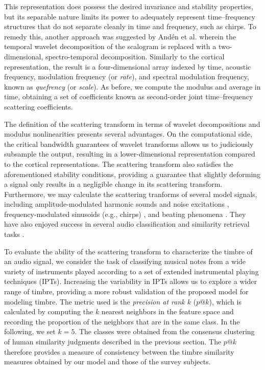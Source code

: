 \documentclass{bmcart}
\makeatletter
\newcommand{\patk}{p\mathrm{@}k}
\makeatother
\begin{document}
This representation does possess the desired invariance and stability properties, but its separable nature limits its power to adequately represent time--frequency structures that do not separate cleanly in time and frequency, such as chirps.
To remedy this, another approach was suggested by And\'{e}n et al. \cite{anden2015joint,anden2019joint} wherein the temporal wavelet decomposition of the scalogram is replaced with a two-dimensional, spectro-temporal decomposition.
Similarly to the cortical representation, the result is a four-dimensional array indexed by time, acoustic frequency, modulation frequency (or \emph{rate}), and spectral modulation frequency, known as \emph{quefrency} (or \emph{scale}).
As before, we compute the modulus and average in time, obtaining a set of coefficients known as second-order joint time--frequency scattering coefficients.

The definition of the scattering transform in terms of wavelet decompositions and modulus nonlinearities presents several advantages.
On the computational side, the critical bandwidth guarantees of wavelet transforms allows us to judiciously subsample the output, resulting in a lower-dimensional representation compared to the cortical representations.
The scattering transform also satisfies the aforementioned stability conditions, providing a guarantee that slightly deforming a signal only results in a negligible change in its scattering transform.
Furthermore, we may calculate the scattering tranforms of several model signals, including amplitude-modulated harmonic sounds and noise excitations \cite{anden2012scattering,anden2014deep}, frequency-modulated sinusoids (e.g., chirps) \cite{anden2012scattering,anden2019joint}, and beating phenomena \cite{anden2014deep}.
They have also enjoyed success in several audio classification and similarity retrieval tasks \cite{anden2011multiscale,bauge2013representing,anden2014deep,anden2019joint,lostanlen2018relevance,lostanlen2018extended}.

To evaluate the ability of the scattering transform to characterize the timbre of an audio signal, we consider the task of classifying musical notes from a wide variety of instruments played according to a set of extended instrumental playing techniques (IPTs).
Increasing the variability in IPTs allows us to explore a wider range of timbre, providing a more robust validation of the proposed model for modeling timbre.
The metric used is the \emph{precision at rank $k$} ($\patk$), which is calculated by computing the $k$ nearest neighbors in the feature space and recording the proportion of the neighbors that are in the same class.
In the following, we set $k = 5$.
The classes were obtained from the consensus clustering of human similarity judgments described in the previous section.
The $\patk$ therefore provides a measure of consistency between the timbre similarity measures obtained by our model and those of the survey subjects.
\end{document}
